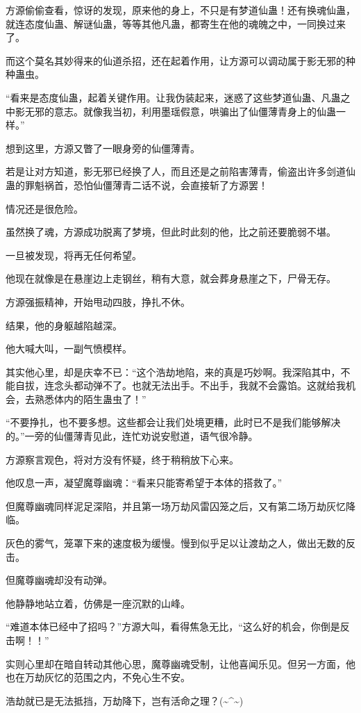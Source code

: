 \begin{this_body}
方源偷偷查看，惊讶的发现，原来他的身上，不只是有梦道仙蛊！还有换魂仙蛊，就连态度仙蛊、解谜仙蛊，等等其他凡蛊，都寄生在他的魂魄之中，一同换过来了。

而这个莫名其妙得来的仙道杀招，还在起着作用，让方源可以调动属于影无邪的种种蛊虫。

“看来是态度仙蛊，起着关键作用。让我伪装起来，迷惑了这些梦道仙蛊、凡蛊之中影无邪的意志。就像我当初，利用墨瑶假意，哄骗出了仙僵薄青身上的仙蛊一样。”

想到这里，方源又瞥了一眼身旁的仙僵薄青。

若是让对方知道，影无邪已经换了人，而且还是之前陷害薄青，偷盗出许多剑道仙蛊的罪魁祸首，恐怕仙僵薄青二话不说，会直接斩了方源罢！

情况还是很危险。

虽然换了魂，方源成功脱离了梦境，但此时此刻的他，比之前还要脆弱不堪。

一旦被发现，将再无任何希望。

他现在就像是在悬崖边上走钢丝，稍有大意，就会葬身悬崖之下，尸骨无存。

方源强振精神，开始甩动四肢，挣扎不休。

结果，他的身躯越陷越深。

他大喊大叫，一副气愤模样。

其实他心里，却是庆幸不已：“这个浩劫地陷，来的真是巧妙啊。我深陷其中，不能自拔，连念头都动弹不了。也就无法出手。不出手，我就不会露馅。这就给我机会，去熟悉体内的陌生蛊虫了！”

“不要挣扎，也不要多想。这些都会让我们处境更糟，此时已不是我们能够解决的。”一旁的仙僵薄青见此，连忙劝说安慰道，语气很冷静。

方源察言观色，将对方没有怀疑，终于稍稍放下心来。

他叹息一声，凝望魔尊幽魂：“看来只能寄希望于本体的搭救了。”

但魔尊幽魂同样泥足深陷，并且第一场万劫风雷囚笼之后，又有第二场万劫灰忆降临。

灰色的雾气，笼罩下来的速度极为缓慢。慢到似乎足以让渡劫之人，做出无数的反击。

但魔尊幽魂却没有动弹。

他静静地站立着，仿佛是一座沉默的山峰。

“难道本体已经中了招吗？”方源大叫，看得焦急无比，“这么好的机会，你倒是反击啊！！”

实则心里却在暗自转动其他心思，魔尊幽魂受制，让他喜闻乐见。但另一方面，他也在万劫灰忆的范围之内，不免心生不安。

浩劫就已是无法抵挡，万劫降下，岂有活命之理？(\~{}\^{}\~{})

\end{this_body}

